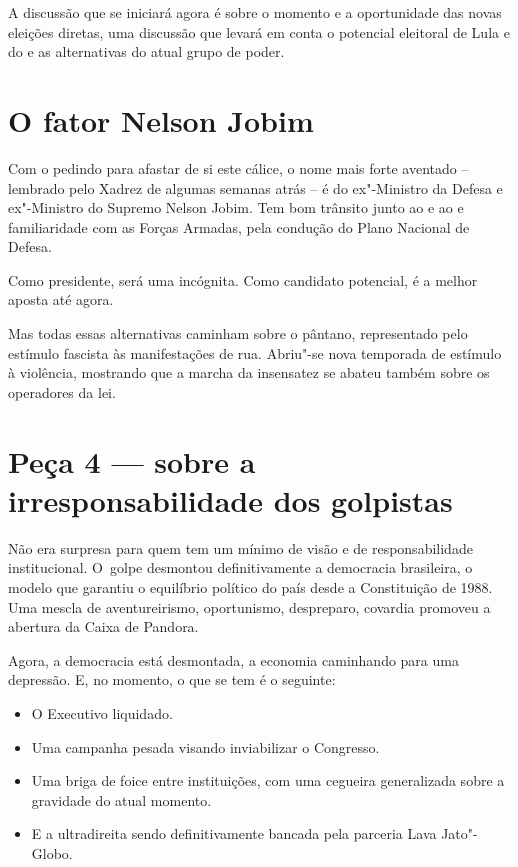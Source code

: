 A discussão que se iniciará agora é sobre o momento e a oportunidade das
novas eleições diretas, uma discussão que levará em conta o potencial
eleitoral de Lula e do  e as alternativas do atual grupo de poder.

\section{O fator Nelson Jobim}

Com o  pedindo para afastar de si este cálice, o nome mais forte
aventado -- lembrado pelo Xadrez de algumas semanas atrás -- é do
ex"-Ministro da Defesa e ex"-Ministro do Supremo Nelson Jobim. Tem bom
trânsito junto ao  e ao  e familiaridade com as Forças Armadas,
pela condução do Plano Nacional de Defesa.

Como presidente, será uma incógnita. Como candidato potencial, é a
melhor aposta até agora.

Mas todas essas alternativas caminham sobre o pântano, representado pelo
estímulo fascista às manifestações de rua. Abriu"-se nova temporada de
estímulo à violência, mostrando que a marcha da insensatez se abateu
também sobre os operadores da lei.

\section{Peça 4 --- sobre a irresponsabilidade dos golpistas}

Não era surpresa para quem tem um mínimo de visão e de responsabilidade
institucional. O~golpe desmontou definitivamente a democracia
brasileira, o modelo que garantiu o equilíbrio político do país desde a
Constituição de 1988. Uma mescla de aventureirismo, oportunismo,
despreparo, covardia promoveu a abertura da Caixa de Pandora.

Agora, a democracia está desmontada, a economia caminhando para uma
depressão. E, no momento, o que se tem é o seguinte:

\begin{itemize}
\itemsep1pt\parskip0pt
\item
  O Executivo liquidado.
\item
  Uma campanha pesada visando inviabilizar o Congresso.
\item
  Uma briga de foice entre instituições, com uma cegueira generalizada
  sobre a gravidade do atual momento.
\item
  E a ultradireita sendo definitivamente bancada pela parceria Lava
  Jato"-Globo.
\end{itemize}

